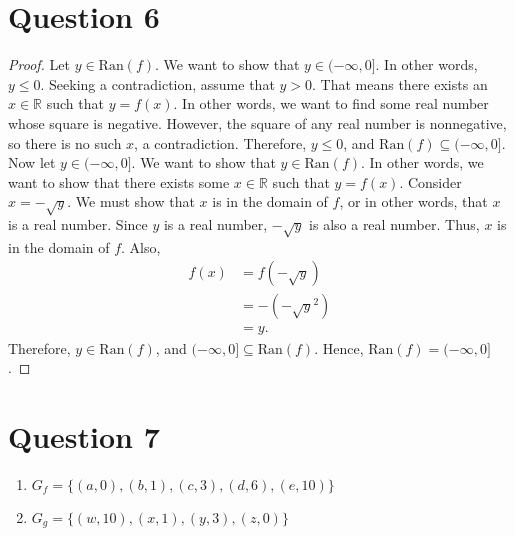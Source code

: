 \documentclass{article}
\begin{document}
\section*{Question 6}
\begin{proof}
    Let $y \in \text{Ran}(f)$.
    We want to show that $y \in (-\infty, 0]$.
    In other words, $y \leq 0$.
    Seeking a contradiction, assume that $y > 0$.
    That means there exists an $x \in \mathbb{R}$ such that $y = f(x)$.
    In other words, we want to find some real number whose square is negative.
    However, the square of any real number is nonnegative, so there is no such $x$, a contradiction.
    Therefore, $y \leq 0$, and $\text{Ran}(f) \subseteq (-\infty, 0]$.
    Now let $y \in (-\infty, 0]$.
    We want to show that $y \in \text{Ran}(f)$.
    In other words, we want to show that there exists some $x \in \mathbb{R}$ such that $y = f(x)$.
    Consider $x = -\sqrt{y}$.
    We must show that $x$ is in the domain of $f$, or in other words, that $x$ is a real number.
    Since $y$ is a real number, $-\sqrt{y}$ is also a real number.
    Thus, $x$ is in the domain of $f$.
    Also,
    \begin{align*}
        f(x) &= f(-\sqrt{y}) \\
        &= - (-\sqrt{y}^2) \\
        &= y.
    \end{align*}
    Therefore, $y \in \text{Ran}(f)$, and $(-\infty, 0] \subseteq \text{Ran}(f)$.
    Hence, $\text{Ran}(f) = (-\infty, 0]$.
\end{proof}

\section*{Question 7}
\begin{enumerate}
    \item $G_f = \{(a, 0), (b, 1), (c, 3), (d, 6), (e, 10)\}$
    \item $G_g = \{(w, 10), (x, 1), (y, 3), (z, 0)\}$
\end{enumerate}
\end{document}
